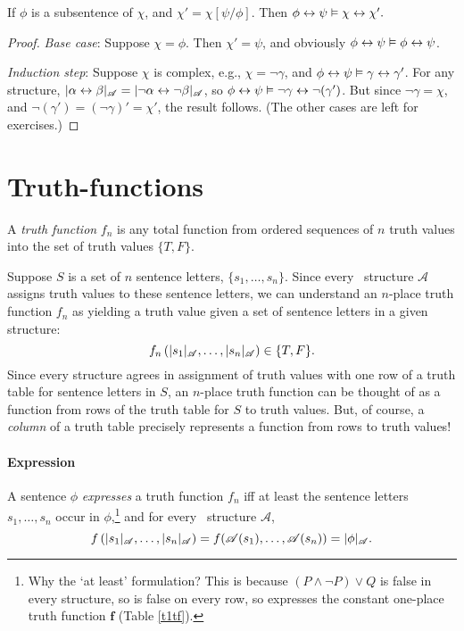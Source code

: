 \begin{theorem}[Equivalence]\label{tequiv}
	If $\phi$ is a subsentence of $\chi$, and $\chi' = \chi[\psi/\phi]$. Then $\phi \leftrightarrow \psi \vDash \chi \leftrightarrow \chi'.$
	\begin{proof} \emph{Base case}: Suppose $\chi=\phi$. Then $\chi'=\psi$, and obviously $\phi\leftrightarrow\psi\vDash\phi\leftrightarrow\psi$.
	
	\emph{Induction step}: Suppose $\chi$ is complex, e.g., $\chi = \neg \gamma$, and $\phi\leftrightarrow\psi \vDash \gamma\leftrightarrow\gamma'$. For any structure, $|\alpha\leftrightarrow\beta|_{\mathscr{A}} = |\neg\alpha \leftrightarrow \neg\beta|_{\mathscr{A}}$, so $\phi\leftrightarrow\psi \vDash \neg\gamma\leftrightarrow\neg(\gamma')$. But since $\neg\gamma=\chi$, and $\neg(\gamma')=(\neg\gamma)'=\chi'$, the result follows. (The other cases are left for exercises.)
	\end{proof}
\end{theorem}

\section{Truth-functions}


\begin{definition}A \emph{truth function} $f_{n}$ is any total function from ordered sequences of $n$ truth values into the set of truth values $\{T,F\}$. \end{definition}
Suppose $S$ is a set of $n$ sentence letters, $\{s_{1},\ldots,s_{n}\}$. Since every \lone\ structure $\mathscr{A}$ assigns truth values to these sentence letters, we can understand an $n$-place truth function $f_{n}$ as yielding a truth value given a set of sentence letters in a given structure: \[f_{n}\left(|s_{1}|_{\mathscr{A}},\ldots,|s_{n}|_{\mathscr{A}}\right) \in \{T,F\}.\] Since every structure agrees in assignment of truth values with one row of a truth table for sentence letters in $S$, an $n$-place truth function can be thought of as a function from rows of the truth table for $S$ to truth values. But, of course, a \emph{column} of a truth table precisely represents a function from rows to truth values!

\paragraph{Expression}
\begin{definition}[Expression]
A sentence $\phi$ \emph{expresses} a truth function $f_{n}$ iff at least the sentence letters $s_{1},\ldots,s_{n}$ occur in $\phi$,\footnote{Why the `at least' formulation? This is because $(P \wedge \neg P) \vee Q$ is false in every structure, so is false on every row, so expresses the constant one-place truth function $\mathbf{f}$ (Table \ref{t1tf}).} and for every \lone\ structure $\mathscr{A}$, $$f\left(|s_{1}|_{\mathscr{A}},\ldots,|s_{n}|_{\mathscr{A}}\right) = f(\mathscr{A}(s_{1}),\ldots,\mathscr{A}(s_{n}))= |\phi|_{\mathscr{A}}.$$
\end{definition}

